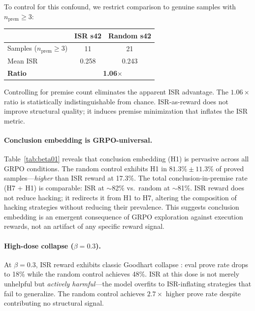 To control for this confound, we restrict comparison to genuine samples with $n_{\text{prem}} \geq 3$:

\vspace{-2pt}
\begin{center}
\small
\begin{tabular}{lcc}
\toprule
 & \textbf{ISR s42} & \textbf{Random s42} \\
\midrule
Samples ($n_{\text{prem}} \geq 3$) & 11 & 21 \\
Mean ISR & 0.258 & 0.243 \\
\textbf{Ratio} & \multicolumn{2}{c}{\textbf{1.06$\times$}} \\
\bottomrule
\end{tabular}
\end{center}
\vspace{-2pt}

\noindent Controlling for premise count eliminates the apparent ISR advantage.
The $1.06\times$ ratio is statistically indistinguishable from chance.
ISR-as-reward does not improve structural quality; it induces premise minimization that inflates the ISR metric.

\paragraph{Conclusion embedding is GRPO-universal.}

Table~\ref{tab:beta01} reveals that conclusion embedding (H1) is pervasive across all GRPO conditions.
The random control exhibits H1 in $81.3\% \pm 11.3\%$ of proved samples---\emph{higher} than ISR reward at 17.3\%.
The total conclusion-in-premise rate (H7 + H1) is comparable: ISR at $\sim$82\% vs.\ random at $\sim$81\%.
ISR reward does not reduce hacking; it redirects it from H1 to H7, altering the composition of hacking strategies without reducing their prevalence.
This suggests conclusion embedding is an emergent consequence of GRPO exploration against execution rewards, not an artifact of any specific reward signal.

\paragraph{High-dose collapse ($\beta{=}0.3$).}

At $\beta{=}0.3$, ISR reward exhibits classic Goodhart collapse \cite{manheim2019categorizing}: eval prove rate drops to 18\% while the random control achieves 48\%.
ISR at this dose is not merely unhelpful but \emph{actively harmful}---the model overfits to ISR-inflating strategies that fail to generalize.
The random control achieves $2.7\times$ higher prove rate despite contributing no structural signal.

